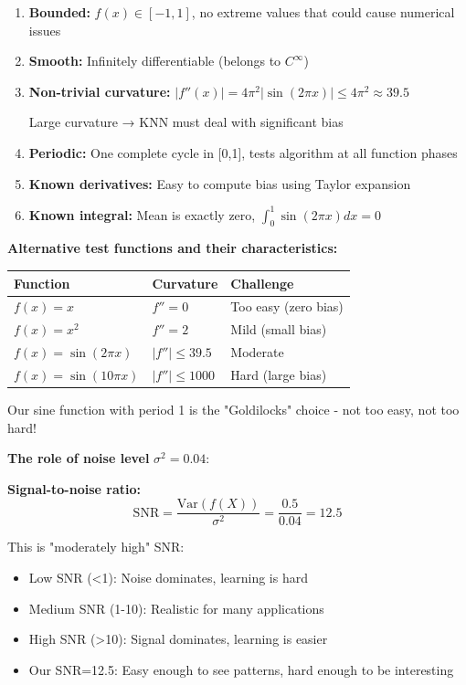 \documentclass[12pt]{article}
\begin{document}
\begin{explanation}
\begin{enumerate}
    \item \textbf{Bounded:} $f(x) \in [-1,1]$, no extreme values that could cause numerical issues

    \item \textbf{Smooth:} Infinitely differentiable (belongs to $C^{\infty}$)

    \item \textbf{Non-trivial curvature:} $|f''(x)| = 4\pi^2|\sin(2\pi x)| \leq 4\pi^2 \approx 39.5$

    Large curvature → KNN must deal with significant bias

    \item \textbf{Periodic:} One complete cycle in [0,1], tests algorithm at all function phases

    \item \textbf{Known derivatives:} Easy to compute bias using Taylor expansion

    \item \textbf{Known integral:} Mean is exactly zero, $\int_0^1 \sin(2\pi x)dx = 0$
\end{enumerate}

\textbf{Alternative test functions and their characteristics:}

\begin{center}
\begin{tabular}{l|l|l}
Function & Curvature & Challenge \\
\hline
$f(x) = x$ & $f'' = 0$ & Too easy (zero bias) \\
$f(x) = x^2$ & $f'' = 2$ & Mild (small bias) \\
$f(x) = \sin(2\pi x)$ & $|f''| \leq 39.5$ & Moderate \\
$f(x) = \sin(10\pi x)$ & $|f''| \leq 1000$ & Hard (large bias) \\
\end{tabular}
\end{center}

Our sine function with period 1 is the "Goldilocks" choice - not too easy, not too hard!

\textbf{The role of noise level} $\sigma^2 = 0.04$:

\textbf{Signal-to-noise ratio:}
\[
\text{SNR} = \frac{\text{Var}(f(X))}{\sigma^2} = \frac{0.5}{0.04} = 12.5
\]

This is "moderately high" SNR:
\begin{itemize}
    \item Low SNR (<1): Noise dominates, learning is hard
    \item Medium SNR (1-10): Realistic for many applications
    \item High SNR (>10): Signal dominates, learning is easier
    \item Our SNR=12.5: Easy enough to see patterns, hard enough to be interesting
\end{itemize}


\end{explanation}
\end{document}
